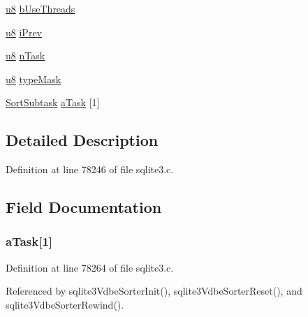 \begin{DoxyCompactItemize}
\item 
\hyperlink{sqlite3_8c_a74a0f6424ae628af25f23f0a35f6ead3}{u8} \hyperlink{struct_vdbe_sorter_a57cf86dcc60eea39f93b5da24d777897}{b\+Use\+Threads}
\item 
\hyperlink{sqlite3_8c_a74a0f6424ae628af25f23f0a35f6ead3}{u8} \hyperlink{struct_vdbe_sorter_ac894894ccae70e0d1291ee9c50e14ea4}{i\+Prev}
\item 
\hyperlink{sqlite3_8c_a74a0f6424ae628af25f23f0a35f6ead3}{u8} \hyperlink{struct_vdbe_sorter_a90ad8d082c3b140c204a0042533f671e}{n\+Task}
\item 
\hyperlink{sqlite3_8c_a74a0f6424ae628af25f23f0a35f6ead3}{u8} \hyperlink{struct_vdbe_sorter_a00cac7e718b98d0a019a2123af7c17bb}{type\+Mask}
\item 
\hyperlink{struct_sort_subtask}{Sort\+Subtask} \hyperlink{struct_vdbe_sorter_ac38bdaba4ffeee1b32ffa791206fa109}{a\+Task} \mbox{[}1\mbox{]}
\end{DoxyCompactItemize}


\subsection{Detailed Description}


Definition at line 78246 of file sqlite3.\+c.



\subsection{Field Documentation}
\hypertarget{struct_vdbe_sorter_ac38bdaba4ffeee1b32ffa791206fa109}{}
\subsubsection[{a\+Task}]{ a\+Task\mbox{[}1\mbox{]}}\label{struct_vdbe_sorter_ac38bdaba4ffeee1b32ffa791206fa109}


Definition at line 78264 of file sqlite3.\+c.



Referenced by sqlite3\+Vdbe\+Sorter\+Init(), sqlite3\+Vdbe\+Sorter\+Reset(), and sqlite3\+Vdbe\+Sorter\+Rewind().

\hypertarget{struct_vdbe_sorter_ab5160dba26e99bef22a9244cd277ffad}{}
